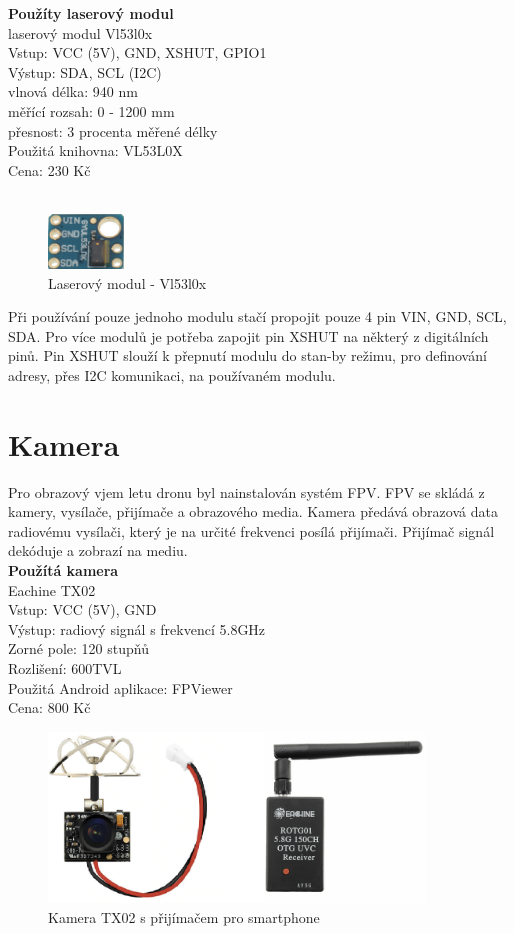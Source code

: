 \textbf{Použíty laserový modul}\\
laserový modul Vl53l0x\\
Vstup: VCC (5V), GND, XSHUT, GPIO1\\
Výstup: SDA, SCL (I2C)\\
vlnová délka: 940 nm\\
měřící rozsah: 0 - 1200 mm\\
přesnost: 3 procenta měřené délky\\
Použitá knihovna: VL53L0X\\
Cena: 230 Kč\\
\cite{laser}\\

\begin{figure}[H]
	\centering
	\includegraphics[width=2cm]{pictures/laser.jpg}
	\caption{Laserový modul - Vl53l0x}
\end{figure}

Při používání pouze jednoho modulu stačí propojit pouze 4 pin VIN, GND, SCL, SDA. Pro více modulů je potřeba zapojit pin XSHUT na některý z digitálních pinů. Pin XSHUT slouží k přepnutí modulu do stan-by režimu, pro definování adresy, přes I2C komunikaci, na používaném modulu.

\section{Kamera}
Pro obrazový vjem letu dronu byl nainstalován systém FPV. FPV se skládá z kamery, vysílače, přijímače a obrazového media. Kamera předává obrazová data radiovému vysílači, který je na určité frekvenci posílá přijímači. Přijímač signál dekóduje a zobrazí na mediu.\\

\textbf{Použítá kamera}\\
Eachine TX02\\
Vstup: VCC (5V), GND\\
Výstup: radiový signál s frekvencí 5.8GHz\\
Zorné pole: 120 stupňů\\
Rozlišení: 600TVL\\
Použitá Android aplikace: FPViewer\\
Cena: 800 Kč\\

\begin{figure}[H]
	\centering
	\includegraphics[width=10cm]{pictures/camera.png}
	\caption{Kamera TX02 s přijímačem pro smartphone}
\end{figure}